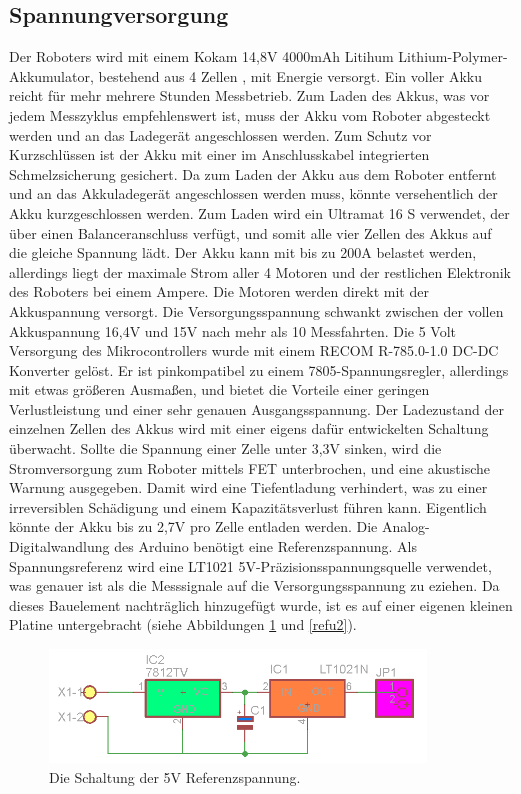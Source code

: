 \documentclass[a4paper,bibtotoc,oneside]{scrbook}
\begin{document}
\subsection{Spannungversorgung}\thispagestyle{empty}
Der Roboters wird mit einem Kokam 14,8V 4000mAh Litihum Lithium-Polymer-Akkumulator, bestehend aus 4 Zellen \cite{kokam}, mit Energie versorgt. Ein voller Akku reicht für mehr mehrere Stunden Messbetrieb. Zum Laden des Akkus, was vor jedem Messzyklus empfehlenswert ist, muss der Akku vom Roboter abgesteckt werden und an das Ladegerät angeschlossen werden. Zum Schutz vor Kurzschlüssen ist der Akku mit einer im Anschlusskabel integrierten Schmelzsicherung gesichert. Da zum Laden der Akku aus dem Roboter entfernt und an das Akkuladegerät angeschlossen werden muss, könnte versehentlich der Akku kurzgeschlossen werden. Zum Laden wird ein Ultramat 16 S verwendet, der über einen Balanceranschluss verfügt, und somit alle vier Zellen des Akkus auf die gleiche Spannung lädt. 
Der Akku kann mit bis zu 200A belastet werden, allerdings liegt der maximale Strom aller 4 Motoren und der restlichen Elektronik des Roboters bei einem Ampere. Die Motoren werden direkt mit der Akkuspannung versorgt. Die Versorgungsspannung schwankt zwischen der vollen Akkuspannung 16,4V und 15V nach mehr als 10 Messfahrten.
Die 5 Volt Versorgung des Mikrocontrollers wurde mit einem RECOM R-785.0-1.0 DC-DC Konverter \cite{ref5} gelöst. Er ist pinkompatibel zu einem 7805-Spannungsregler, allerdings mit etwas größeren Ausmaßen, und bietet die Vorteile einer geringen Verlustleistung und einer sehr genauen Ausgangsspannung. 
Der Ladezustand der einzelnen Zellen des Akkus wird mit einer eigens dafür entwickelten Schaltung überwacht. Sollte die Spannung einer Zelle unter 3,3V sinken, wird die Stromversorgung zum Roboter mittels FET unterbrochen, und eine akustische Warnung ausgegeben. Damit wird eine Tiefentladung verhindert, was zu einer irreversiblen Schädigung und einem Kapazitätsverlust führen kann. Eigentlich könnte der Akku bis zu 2,7V pro Zelle entladen werden.
Die Analog-Digitalwandlung des Arduino benötigt eine Referenzspannung. Als Spannungsreferenz wird eine LT1021 5V-Präzisionsspannungsquelle \cite{lt1021} verwendet, was genauer ist als die Messsignale auf die Versorgungsspannung zu eziehen. Da dieses Bauelement nachträglich hinzugefügt wurde, ist es auf einer eigenen kleinen Platine untergebracht (siehe Abbildungen \ref{refu} und \ref{refu2}).

\begin{figure}[htbp]
\centering
\includegraphics[width=100mm]{img/refu.png}
\caption{Die Schaltung der 5V Referenzspannung.}\label{refu}
\end{figure}
\end{document}
